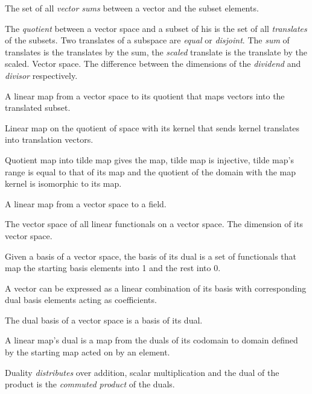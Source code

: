 \begin{multicols}{3}
  The set of all \textit{vector sums} between a vector and the subset elements.

  The \textit{quotient} between a vector space and a subset of his is the set of all
  \textit{translates} of the subsets.
  Two translates of a subspace are \textit{equal} or \textit{disjoint}.
  The \textit{sum} of translates is the translates by the sum, the \textit{scaled} translate
  is the translate by the scaled.
   Vector space.
  The difference between the dimensions of the \textit{dividend} and \textit{divisor} respectively.

  A linear map from a vector space to its quotient that maps vectors
  into the translated subset.

  Linear map on the quotient of space with its kernel that
  sends kernel translates into translation vectors.

  Quotient map into tilde map gives the map, tilde map is injective,
  tilde map's range is equal to that of its map and
  the quotient of the domain with the map kernel is isomorphic
  to its map.


  A linear map from a vector space to a field.

  The vector space of all linear functionals on a vector space.
  The dimension of its vector space.

  Given a basis of a vector space, the basis of its dual
  is a set of functionals that map the starting basis elements
  into 1 and the rest into 0.

  A vector can be expressed as a linear combination of its
  basis with corresponding dual basis elements acting as
  coefficients.

  The dual basis of a vector space is a basis of its dual.

  A linear map's dual is a map from the duals of its codomain
  to domain defined by the starting map acted on by an element.

  Duality \textit{distributes} over addition, scalar multiplication
  and the dual of the product is the \textit{commuted product} of the duals.


\end{multicols}
